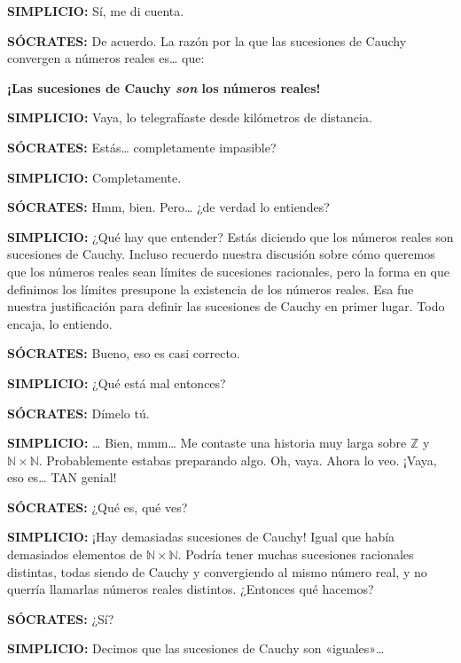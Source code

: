 \medskip
\noindent\textbf{SIMPLICIO:} Sí, me di cuenta.

\medskip
\noindent\textbf{SÓCRATES:} De acuerdo. La razón por la que las sucesiones de Cauchy convergen a números reales es\ldots{} que:
\begin{center}
  \Large\textbf{¡Las sucesiones de Cauchy \emph{son} los números reales!}
\end{center}

\medskip
\noindent\textbf{SIMPLICIO:} Vaya, lo telegrafíaste desde kilómetros de distancia.

\medskip
\noindent\textbf{SÓCRATES:} Estás\ldots{} completamente impasible?

\medskip
\noindent\textbf{SIMPLICIO:} Completamente.

\medskip
\noindent\textbf{SÓCRATES:} Hmm, bien. Pero\ldots{} ¿de verdad lo entiendes?

\medskip
\noindent\textbf{SIMPLICIO:} ¿Qué hay que entender? Estás diciendo que los números reales son sucesiones de Cauchy. Incluso recuerdo nuestra discusión sobre cómo queremos que los números reales sean límites de sucesiones racionales, pero la forma en que definimos los límites presupone la existencia de los números reales. Esa fue nuestra justificación para definir las sucesiones de Cauchy en primer lugar. Todo encaja, lo entiendo.

\medskip
\noindent\textbf{SÓCRATES:} Bueno, eso es casi correcto.

\medskip
\noindent\textbf{SIMPLICIO:} ¿Qué está mal entonces?

\medskip
\noindent\textbf{SÓCRATES:} Dímelo tú.

\medskip
\noindent\textbf{SIMPLICIO:} \ldots{} Bien, mmm\ldots{} Me contaste una historia muy larga sobre $\mathbb{Z}$ y $\mathbb{N} \times \mathbb{N}$. Probablemente estabas preparando algo. Oh, vaya. Ahora lo veo. ¡Vaya, eso es\ldots{} TAN genial!

\medskip
\noindent\textbf{SÓCRATES:} ¿Qué es, qué ves?

\medskip
\noindent\textbf{SIMPLICIO:} ¡Hay demasiadas sucesiones de Cauchy! Igual que había demasiados elementos de $\mathbb{N} \times \mathbb{N}$. Podría tener muchas sucesiones racionales distintas, todas siendo de Cauchy y convergiendo al mismo número real, y no querría llamarlas números reales distintos. ¿Entonces qué hacemos?

\medskip
\noindent\textbf{SÓCRATES:} ¿Sí?

\medskip
\noindent\textbf{SIMPLICIO:} Decimos que las sucesiones de Cauchy son «iguales»\ldots


